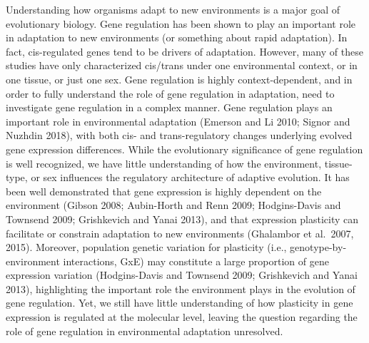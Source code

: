 \documentclass[9pt,twocolumn,twoside,lineno]{pnas-new}
\begin{document}
Understanding how organisms adapt to new environments is a major goal of
evolutionary biology. Gene regulation has been shown to play an
important role in adaptation to new environments (or something about
rapid adaptation). In fact, cis-regulated genes tend to be drivers of
adaptation. However, many of these studies have only characterized
cis/trans under one environmental context, or in one tissue, or just one
sex. Gene regulation is highly context-dependent, and in order to fully
understand the role of gene regulation in adaptation, need to
investigate gene regulation in a complex manner. Gene regulation plays
an important role in environmental adaptation (Emerson and Li 2010;
Signor and Nuzhdin 2018), with both cis- and trans-regulatory changes
underlying evolved gene expression differences. While the evolutionary
significance of gene regulation is well recognized, we have little
understanding of how the environment, tissue-type, or sex influences the
regulatory architecture of adaptive evolution. It has been well
demonstrated that gene expression is highly dependent on the environment
(Gibson 2008; Aubin-Horth and Renn 2009; Hodgins-Davis and Townsend
2009; Grishkevich and Yanai 2013), and that expression plasticity can
facilitate or constrain adaptation to new environments (Ghalambor et
al.~2007, 2015). Moreover, population genetic variation for plasticity
(i.e., genotype-by-environment interactions, GxE) may constitute a large
proportion of gene expression variation (Hodgins-Davis and Townsend
2009; Grishkevich and Yanai 2013), highlighting the important role the
environment plays in the evolution of gene regulation. Yet, we still
have little understanding of how plasticity in gene expression is
regulated at the molecular level, leaving the question regarding the
role of gene regulation in environmental adaptation unresolved.
\end{document}
